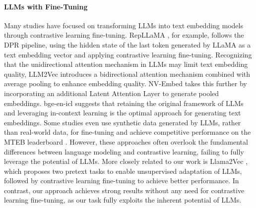 \paragraph{LLMs with Fine-Tuning}
Many studies have focused on transforming LLMs into text embedding models through contrastive learning fine-tuning. RepLLaMA \citep{DBLP:conf/sigir/MaWYWL24}, for example, follows the DPR \citep{DBLP:conf/emnlp/KarpukhinOMLWEC20} pipeline, using the hidden state of the last token generated by LLaMA as a text embedding vector and applying contrastive learning fine-tuning. Recognizing that the unidirectional attention mechanism in LLMs may limit text embedding quality, LLM2Vec \citep{DBLP:journals/corr/abs-2404-05961} introduces a bidirectional attention mechanism combined with average pooling to enhance embedding quality. NV-Embed \citep{DBLP:journals/corr/abs-2405-17428} takes this further by incorporating an additional Latent Attention Layer to generate pooled embeddings. bge-en-icl \cite{DBLP:journals/corr/abs-2409-15700} suggests that retaining the original framework of LLMs and leveraging in-context learning is the optimal approach for generating text embeddings. Some studies \cite{DBLP:conf/acl/WangYHYMW24} even use synthetic data generated by LLMs, rather than real-world data, for fine-tuning and achieve competitive performance on the MTEB leaderboard \cite{DBLP:conf/eacl/MuennighoffTMR23}. However, these approaches often overlook the fundamental differences between language modeling and contrastive learning, failing to fully leverage the potential of LLMs. More closely related to our work is Llama2Vec \cite{DBLP:conf/acl/Li0XSL24}, which proposes two pretext tasks to enable unsupervised adaptation of LLMs, followed by contrastive learning fine-tuning to achieve better performance. In contrast, our approach achieves strong results without any need for contrastive learning fine-tuning, as our task fully exploits the inherent potential of LLMs.



